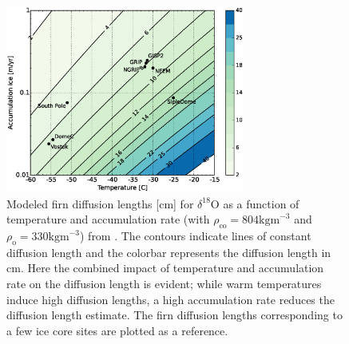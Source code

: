 \documentclass[11pt, draftcls, onecolumn]{IEEEtran} %
\numberwithin{equation}{section}
\numberwithin{table}{section}
\numberwithin{figure}{section}
\begin{document}
\begin{figure}[]	
	\vspace*{2mm}
	\begin{center}
		\includegraphics[width=0.7\textwidth]{Figure_2}
		\caption{Modeled firn diffusion lengths [cm] for $\delta^{18}$O as a function of temperature and accumulation rate
				 (with $\rho_{\mathrm{co}}=804 \mathrm{kg m}^{-3}$ and
				$\rho_{\mathrm{o}}=330 \mathrm{kg m}^{-3}$) from \cite{Gkinis2014}. 
				The contours indicate lines of constant diffusion length and the colorbar represents the diffusion length in cm.
				Here the combined impact of temperature and accumulation rate on the diffusion length is evident;
				while warm temperatures induce high diffusion lengths, a high accumulation rate reduces the diffusion length estimate.
				The firn diffusion lengths corresponding to a few ice core sites are plotted as a reference.}
		\label{fig:diffusion_map}		
	\end{center}
	
\end{figure}

\end{document}

